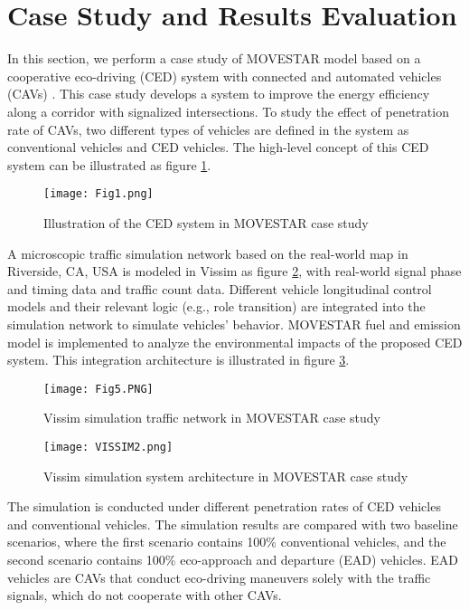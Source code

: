 \documentclass{article}
\begin{document}

\section{Case Study and Results Evaluation}
\label{sec:case}
In this section, we perform a case study of MOVESTAR model based on a cooperative eco-driving (CED) system with connected and automated vehicles (CAVs) \cite{wang2020cooperative}. This case study develops a system to improve the energy efficiency along a corridor with signalized intersections. To study the effect of penetration rate of CAVs, two different types of vehicles are defined in the system as conventional vehicles and CED vehicles. The high-level concept of this CED system can be illustrated as figure \ref{CED}.

\begin{figure}[ht!]
    \centering
    \texttt{[image: Fig1.png]}
    \caption{Illustration of the CED system in MOVESTAR case study}
    \label{CED}
\end{figure}

A microscopic traffic simulation network based on the real-world map in Riverside, CA, USA is modeled in Vissim as figure \ref{network}, with real-world signal phase and timing data and traffic count data. Different vehicle longitudinal control models and their relevant logic (e.g., role transition) are integrated into the simulation network to simulate vehicles’ behavior. MOVESTAR fuel and emission model is implemented to analyze the environmental impacts of the proposed CED system. This integration architecture is illustrated in figure \ref{arc}.

\begin{figure}[ht!]
    \centering
    \texttt{[image: Fig5.PNG]}
    \caption{Vissim simulation traffic network in MOVESTAR case study}
    \label{network}
\end{figure}

\begin{figure}[ht!]
    \centering
    \texttt{[image: VISSIM2.png]}
    \caption{Vissim simulation system architecture in MOVESTAR case study}
    \label{arc}
\end{figure}

The simulation is conducted under different penetration rates of CED vehicles and conventional vehicles. The simulation results are compared with two baseline scenarios, where the first scenario contains 100\% conventional vehicles, and the second scenario contains 100\% eco-approach and departure (EAD) vehicles. EAD vehicles are CAVs that conduct eco-driving maneuvers solely with the traffic signals, which do not cooperate with other CAVs.
\end{document}
